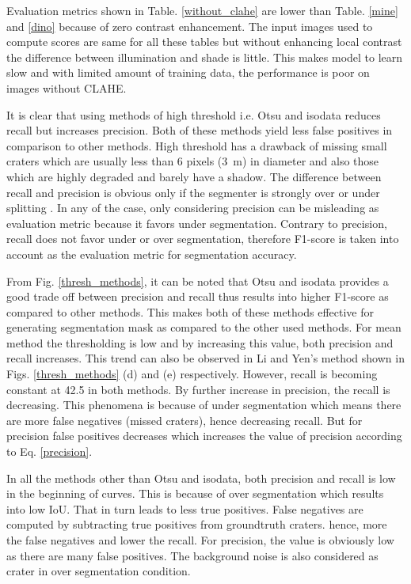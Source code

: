 \documentclass[11pt]{article}
\begin{document}
Evaluation metrics shown in Table. \ref{without_clahe} are lower than Table. \ref{mine} and \ref{dino} because of zero contrast enhancement. The input images used to compute scores are same for all these tables but without enhancing local contrast the difference between illumination and shade is little. This makes model to learn slow and with limited amount of training data, the performance is poor on images without CLAHE.

It is clear that using methods of high threshold i.e. Otsu and isodata reduces recall but increases precision. Both of these methods yield less false positives in comparison to other methods. High threshold has a drawback of missing small craters which are usually less than 6 pixels (\SI{3}{m}) in diameter and also those which are highly degraded and barely have a shadow. The difference between recall and  precision is obvious only if the segmenter is strongly over or under splitting \cite{badrinarayanan2017segnet}. In any of the case, only considering precision can be misleading as evaluation metric because it favors under segmentation. Contrary to precision, recall does not favor under or over segmentation, therefore F1-score is taken into account as the evaluation metric for segmentation accuracy. 

From Fig. \ref{thresh_methods}, it can be noted that Otsu and isodata provides a good trade off between precision and recall thus results into higher F1-score as compared to other methods. This makes both of these methods effective for generating segmentation mask as compared to the other used methods. For mean method the thresholding is low and by increasing this value, both precision and recall increases. This trend can also be observed in Li and Yen's method shown in Figs. \ref{thresh_methods} (d) and (e) respectively. However, recall is becoming constant at 42.5 in both methods. By further increase in precision, the recall is decreasing. This phenomena is because of under segmentation which means there are more false negatives (missed craters), hence decreasing recall. But for precision false positives decreases which increases the value of precision according to Eq. \ref{precision}.

In all the methods other than Otsu and isodata, both precision and recall is low in the beginning of curves. This is because of over segmentation which results into low IoU. That in turn leads to less true positives. False negatives are computed by subtracting true positives from groundtruth craters. hence, more the false negatives and lower the recall. For precision, the value is obviously low as there are many false positives. The background noise is also considered as crater in over segmentation condition.
\end{document}
